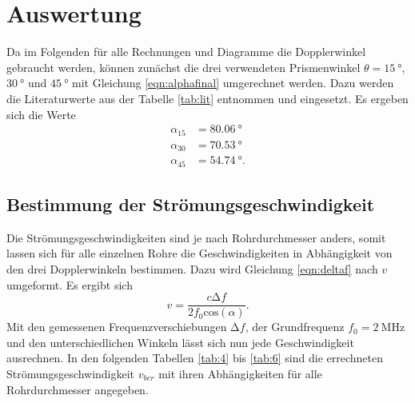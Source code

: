 \section{Auswertung}

Da im Folgenden für alle Rechnungen und Diagramme die Dopplerwinkel gebraucht werden, können zunächst die drei verwendeten Prismenwinkel $\theta = \SI{15}{\degree}$, $\SI{30}{\degree}$ und $\SI{45}{\degree} $ mit Gleichung
\eqref{eqn:alphafinal} umgerechnet werden. Dazu werden die Literaturwerte \cite{skript} aus der Tabelle \ref{tab:lit} entnommen und eingesetzt. Es ergeben sich die Werte
\begin{align*}
    \alpha_{15} &= \SI{80.06}{\degree} \\
    \alpha_{30} &= \SI{70.53}{\degree} \\
    \alpha_{45} &= \SI{54.74}{\degree}.
  \end{align*}

\subsection{Bestimmung der Strömungsgeschwindigkeit}
Die Strömungsgeschwindigkeiten sind je nach Rohrdurchmesser anders, somit lassen sich für alle einzelnen Rohre die Geschwindigkeiten in Abhängigkeit von den drei Dopplerwinkeln bestimmen.
Dazu wird Gleichung \eqref{eqn:deltaf} nach $v$ umgeformt. Es ergibt sich
\begin{equation}
v = \frac{c \increment f}{2 f_{0} \text{cos}(\alpha)}.
\end{equation}
Mit den gemessenen Frequenzverschiebungen $\increment f$, der Grundfrequenz $f_{0} = \SI{2}{\mega\hertz}$ und den unterschiedlichen Winkeln lässt sich nun jede Geschwindigkeit ausrechnen. 
In den folgenden Tabellen \ref{tab:4} bis \ref{tab:6} sind die errechneten Strömungsgeschwindigkeit $v_{ber}$ mit ihren Abhängigkeiten für alle Rohrdurchmesser angegeben.

